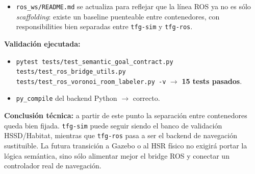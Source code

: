\documentclass[11pt,a4paper]{article}
\begin{document}
\begin{itemize}
\begin{itemize}
                \texttt{PoseStamped};
          \item la cancelación genera el \texttt{GoalID} esperado;
          \item los resultados JSON y los resultados compatibles con
                \texttt{move\_base} se traducen al contrato
                \texttt{NavigationResult}.
        \end{itemize}
  \item \texttt{ros\_ws/README.md} se actualiza para reflejar que la línea ROS
        ya no es sólo \emph{scaffolding}: existe un baseline puenteable entre
        contenedores, con responsibilities bien separadas entre
        \texttt{tfg-sim} y \texttt{tfg-ros}.
\end{itemize}

\textbf{Validación ejecutada:}
\begin{itemize}
  \item \texttt{pytest tests/test\_semantic\_goal\_contract.py
        tests/test\_ros\_bridge\_utils.py
        tests/test\_ros\_voronoi\_room\_labeler.py -v}
        $\rightarrow$ \textbf{15 tests pasados}.
  \item \texttt{py\_compile} del backend Python $\rightarrow$ correcto.
\end{itemize}

\textbf{Conclusión técnica:} a partir de este punto la separación entre
contenedores queda bien fijada. \texttt{tfg-sim} puede seguir siendo el banco
de validación HSSD/Habitat, mientras que \texttt{tfg-ros} pasa a ser el backend
de navegación sustituible. La futura transición a Gazebo o al HSR físico no
exigirá portar la lógica semántica, sino sólo alimentar mejor el bridge ROS y
conectar un controlador real de navegación.
\end{document}
